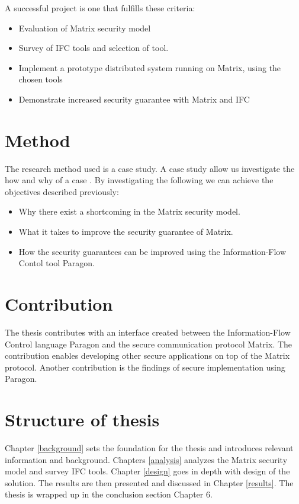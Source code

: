 A successful project is one that fulfills these criteria: 

\begin{itemize}
	\item Evaluation of Matrix security model
	\item Survey of IFC tools and selection of tool.
	\item Implement a prototype distributed system running on Matrix, using the chosen tools
	\item Demonstrate increased security guarantee with Matrix and IFC
\end{itemize}   

\section{Method}
The research method used is a case study. A case study allow us investigate 
the how and why of a case \cite{yin}. By investigating the following we can achieve the objectives described previously:

\begin{itemize}
	\item Why there exist a shortcoming in the Matrix security model.
	\item What it takes to improve the security guarantee of Matrix. 
	\item How the security guarantees can be improved using the Information-Flow Contol tool Paragon.
\end{itemize}


\section{Contribution} %

The thesis contributes with an interface created between the Information-Flow Control language Paragon and the secure communication protocol Matrix. The contribution enables developing other secure applications on top of the Matrix protocol. Another contribution is the findings of secure implementation using Paragon.

 
 
\section{Structure of thesis} %

Chapter \ref{background} sets the foundation for the thesis and introduces relevant information and background. Chapters \ref{analysis} analyzes the Matrix security model and survey IFC tools. Chapter \ref{design} goes in depth with design of the solution. The results are then presented and discussed in Chapter \ref{results}. The thesis is wrapped up in the conclusion section Chapter 6. 
 
